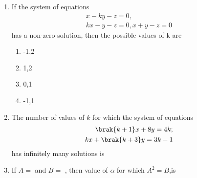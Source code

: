 \begin{enumerate}
		\begin{multicols}{2}
			\begin{enumerate}
				\item $A + B = B + A$
				\item $A + B = A - B$
				\columnbreak
				\item $A - B = B - A$
				\item $AB = BA$
			\end{enumerate}
		\end{multicols}
\item If the system of equations
    \begin{align*}
        x-ky-z=0 ,\\ kx-y-z=0,x+y-z=0
    \end{align*} has a non-zero  solution,  then the possible values of k are 
    \hfill{}
    \begin{multicols}{4}
        \begin{enumerate}
            \item -1,2 \columnbreak
            \item 1,2 \columnbreak
            \item 0,1 \columnbreak
            \item -1,1
        \end{enumerate}
    \end{multicols}
\item The number of values of $k$ for which the system of equations 
    \begin{align*}
    \brak{k+1}x + 8y=4k; \\ kx +\brak{k+3}y=3k-1 \end{align*} has infinitely many solutions is 
    \hfill{}
    \begin{enumerate}
    \end{enumerate}

\item If $A=$
     and $B=$ , then value of $\alpha$ for which $A^2 = B$,is
    \hfill{}
    \begin{enumerate}
            \begin{multicols}{2}


\end{multicols}
\end{enumerate}
\end{enumerate}

